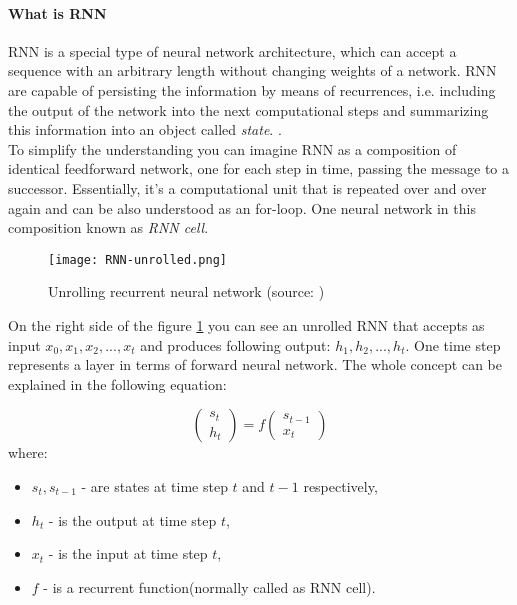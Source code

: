 \paragraph{What is \gls{RNN}} \gls{RNN} is a special type of neural network architecture, which can
accept a sequence with an arbitrary length without changing weights of a network.
\gls{RNN} are capable of persisting the information by means of recurrences, i.e. including
the output of the network into the next computational steps and summarizing this information
into an object called \emph{state}.
 \cite{Kriesel2007NeuralNetworks}.
\\
To simplify the understanding you can imagine \gls{RNN} as a composition of identical
feedforward network, one for each step in time, passing the message to a successor.
Essentially, it's a computational unit that is repeated over and over again and
can be also understood as an for-loop.
One neural network in this composition known as \emph{RNN cell}.

\begin{figure}[H]
	\texttt{[image: RNN-unrolled.png]}
	\caption{Unrolling recurrent neural network (source: \cite{ColahChristopher2015})}
	\label{img:rnn_unrolled}
\end{figure}

On the right side of the figure \ref{img:rnn_unrolled} you can see an
unrolled RNN that accepts as input $x_0, x_1, x_2, ..., x_t$ and produces following
output: $h_1, h_2, ..., h_t$. One time step represents a layer in terms
of forward neural network.
The whole concept can be explained in the following
equation:

\begin{equation} \label{eq:rnn_basic}
	\begin{pmatrix}
		s_t \\
		h_t
	\end{pmatrix} = f
	\begin{pmatrix}
		s_{t-1} \\
		x_t
	\end{pmatrix}
\end{equation}
where:
\begin{itemize}
	\item $s_t, s_{t-1}$ - are states at time step $t$ and $t-1$ respectively,
	\item $h_t$ - is the output at time step $t$,
	\item $x_t$ - is the input at time step $t$,
	\item $f$ - is a recurrent function(normally called as RNN cell).
\end{itemize}

